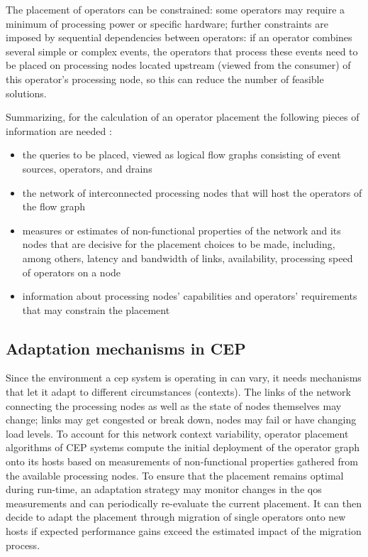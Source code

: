 The placement of operators can be constrained: some operators may require a minimum of processing power or specific hardware; further constraints are imposed by sequential dependencies between operators: if an operator combines several simple or complex events, the operators that process these events need to be placed on processing nodes located upstream (viewed from the consumer) of this operator's processing node, so this can reduce the number of feasible solutions. 

Summarizing, for the calculation of an operator placement the following pieces of information are needed \cite{Lakshmanan2008}:
\begin{itemize}
\item the queries to be placed, viewed as logical flow graphs consisting of event sources, operators, and drains
\item the network of interconnected processing nodes that will host the operators of the flow graph
\item measures or estimates of non-functional properties of the network and its nodes that are decisive for the placement choices  to be made, including, among others, latency and bandwidth of links, availability, processing speed of operators on a node 
\item information about processing nodes' capabilities and operators' requirements that may constrain the placement
\end{itemize}


\subsection{Adaptation mechanisms in CEP}
Since the environment a \gls{cep} system is operating in can vary, it needs mechanisms that let it adapt to different circumstances (contexts). The links of the network connecting the processing nodes as well as the state of nodes themselves may change; links may get congested or break down, nodes may fail or have changing load levels.
To account for this network context variability, operator placement algorithms of \gls{CEP} systems compute the initial deployment of the operator graph onto its hosts based on measurements of non-functional properties gathered from the available processing nodes. 
To ensure that the placement remains optimal during run-time, an adaptation strategy may monitor changes in the \gls{qos} measurements and can periodically re-evaluate the current placement. It can then decide to adapt the placement through migration of single operators onto new hosts if expected performance gains exceed the estimated impact of the migration process.


